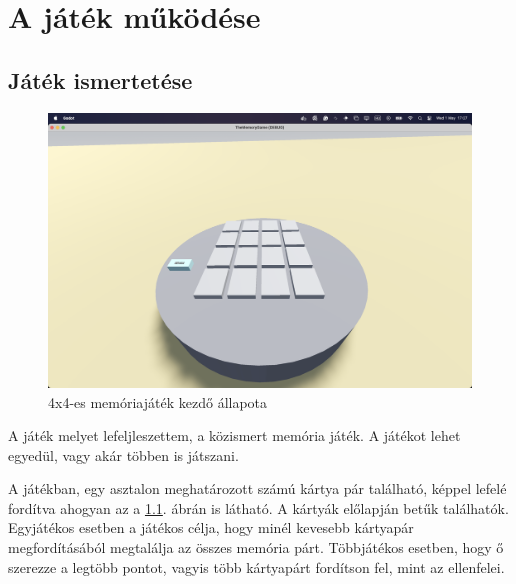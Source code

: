 \chapter{A játék működése}

\thispagestyle{fancy}
\pagestyle{fancy}
\section{Játék ismertetése}
\begin{figure}
    \includegraphics[width=\textwidth]{img/asztal_4x4.png}
    \caption{4x4-es memóriajáték kezdő állapota}
    \label{img:asztal}
\end{figure}

A játék melyet lefeljleszettem, a közismert memória játék. A játékot lehet egyedül, vagy akár többen is játszani.

A játékban, egy asztalon meghatározott számú kártya pár található, képpel lefelé fordítva ahogyan az a \ref{img:asztal}. ábrán is látható.
A kártyák előlapján betűk találhatók. Egyjátékos esetben a játékos célja, hogy minél kevesebb kártyapár megfordításából megtalálja az összes memória párt. Többjátékos esetben, hogy ő szerezze a legtöbb pontot, vagyis több kártyapárt fordítson fel, mint az ellenfelei.

